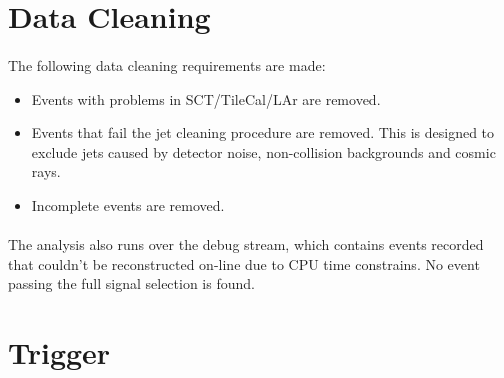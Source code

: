 \section{Data Cleaning}
\label{evt-sel:cleaning}
\paragraph{}
The following data cleaning requirements are made:
\begin{itemize}
\item Events with problems in SCT/TileCal/LAr are removed.
\item Events that fail the jet cleaning procedure are removed. This is designed to exclude jets caused by detector noise, non-collision backgrounds and cosmic rays. 
\item Incomplete events are removed.
\end{itemize}
\paragraph{}
The analysis also runs over the debug stream, which contains events recorded that couldn't be reconstructed on-line due to CPU time constrains. No event passing the full signal selection is found.

\section{Trigger}
\label{evt-sel:trig}


